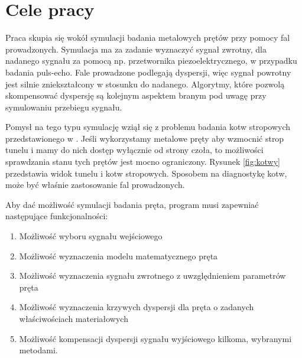 \section{Cele pracy}
\label{sec:cel}


Praca skupia się wokół symulacji badania metalowych prętów przy pomocy fal prowadzonych. Symulacja ma za zadanie wyznaczyć sygnał zwrotny, dla nadanego sygnału za pomocą np. przetwornika piezoelektrycznego, w przypadku badania puls-echo. Fale prowadzone podlegają dyspersji, więc sygnał powrotny jest silnie zniekształcony w stosunku do nadanego. Algorytmy, które pozwolą skompensować dyspersję są kolejnym aspektem branym pod uwagę przy symulowaniu przebiegu sygnału.

Pomysł na tego typu symulację wziął się z problemu badania kotw stropowych przedstawionego w \cite{kotwy}. Jeśli wykorzystamy metalowe pręty aby wzmocnić strop tunelu i mamy do nich dostęp wyłącznie od strony czoła, to możliwości sprawdzania stanu tych prętów jest mocno ograniczony. Rysunek \ref{fig:kotwy} przedstawia widok tunelu i kotw stropowych. Sposobem na diagnostykę kotw, może być właśnie zastosowanie fal prowadzonych. 

Aby dać możliwość symulacji badania pręta, program musi zapewniać następujące funkcjonalności:
\begin{enumerate}
  \item Możliwość wyboru sygnału wejściowego
  \item Możliwość wyznaczenia modelu matematycznego pręta
  \item Możliwość wyznaczenia sygnału zwrotnego z uwzględnieniem parametrów pręta
  \item Możliwość wyznaczenia krzywych dyspersji dla pręta o zadanych właściwościach materiałowych
  \item Możliwość kompensacji dyspersji sygnału wyjściowego kilkoma, wybranymi metodami.
\end{enumerate}

\vspace{5mm}




















